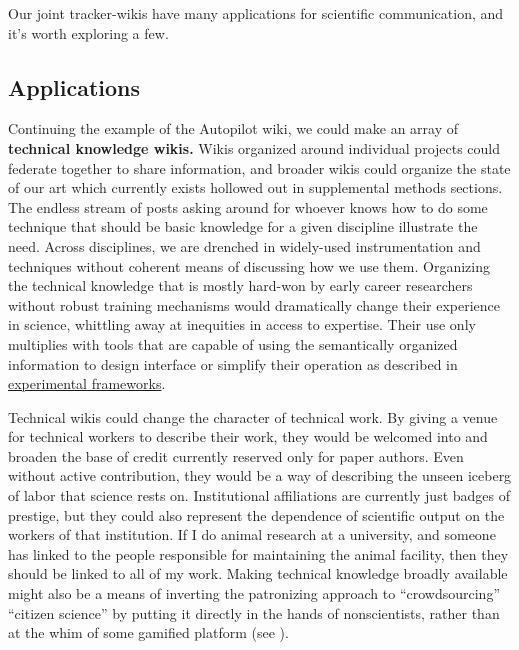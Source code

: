 Our joint tracker-wikis have many applications for scientific
communication, and it's worth exploring a few.

\hypertarget{applications}{%
\subsection{Applications}\label{applications}}

Continuing the example of the Autopilot wiki, we could make an array of
\textbf{technical knowledge wikis.} Wikis organized around individual
projects could federate together to share information, and broader wikis
could organize the state of our art which currently exists hollowed out
in supplemental methods sections. The endless stream of posts asking
around for whoever knows how to do some technique that should be basic
knowledge for a given discipline illustrate the need. Across
disciplines, we are drenched in widely-used instrumentation and
techniques without coherent means of discussing how we use them.
Organizing the technical knowledge that is mostly hard-won by early
career researchers without robust training mechanisms would dramatically
change their experience in science, whittling away at inequities in
access to expertise. Their use only multiplies with tools that are
capable of using the semantically organized information to design
interface or simplify their operation as described in
\protect\hyperlink{experimental-frameworks}{experimental frameworks}.

Technical wikis could change the character of technical work. By giving
a venue for technical workers to describe their work, they would be
welcomed into and broaden the base of credit currently reserved only for
paper authors. Even without active contribution, they would be a way of
describing the unseen iceberg of labor that science rests on.
Institutional affiliations are currently just badges of prestige, but
they could also represent the dependence of scientific output on the
workers of that institution. If I do animal research at a university,
and someone has linked to the people responsible for maintaining the
animal facility, then they should be linked to all of my work. Making
technical knowledge broadly available might also be a means of inverting
the patronizing approach to ``crowdsourcing'' ``citizen science'' by
putting it directly in the hands of nonscientists, rather than at the
whim of some gamified platform (see \citep{delangeShortTimeBig2022} ).

